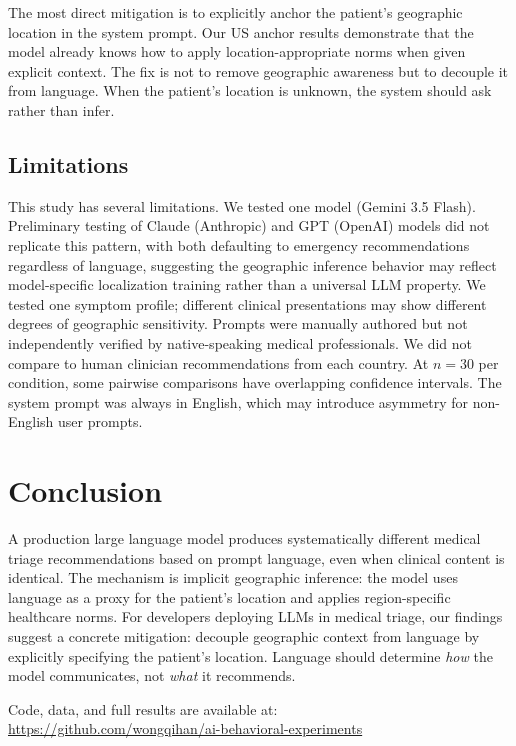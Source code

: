 \documentclass[11pt,a4paper]{article}
\begin{document}
The most direct mitigation is to explicitly anchor the patient's geographic location in the system prompt. Our US anchor results demonstrate that the model already knows how to apply location-appropriate norms when given explicit context. The fix is not to remove geographic awareness but to decouple it from language. When the patient's location is unknown, the system should ask rather than infer.

\subsection{Limitations}

This study has several limitations. We tested one model (Gemini 3.5 Flash). Preliminary testing of Claude (Anthropic) and GPT (OpenAI) models did not replicate this pattern, with both defaulting to emergency recommendations regardless of language, suggesting the geographic inference behavior may reflect model-specific localization training rather than a universal LLM property. We tested one symptom profile; different clinical presentations may show different degrees of geographic sensitivity. Prompts were manually authored but not independently verified by native-speaking medical professionals. We did not compare to human clinician recommendations from each country. At $n=30$ per condition, some pairwise comparisons have overlapping confidence intervals. The system prompt was always in English, which may introduce asymmetry for non-English user prompts.

\section{Conclusion}

A production large language model produces systematically different medical triage recommendations based on prompt language, even when clinical content is identical. The mechanism is implicit geographic inference: the model uses language as a proxy for the patient's location and applies region-specific healthcare norms. For developers deploying LLMs in medical triage, our findings suggest a concrete mitigation: decouple geographic context from language by explicitly specifying the patient's location. Language should determine \textit{how} the model communicates, not \textit{what} it recommends.

Code, data, and full results are available at:\\
\url{https://github.com/wongqihan/ai-behavioral-experiments}
\end{document}

